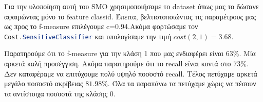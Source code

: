 Για την υλοποίηση αυτή του SMO χρησιμοποιήσαμε το dataset όπως μας το δώσανε αφαιρώντας μόνο το feature classid.
Έπειτα, βελτιστοποιώντας τις παραμέτρους μας ως προς το f-measure επιλέγουμε c=0.94.Ακόμα φορτώσαμε τον \lstinline[language=Java]!Cost.SensitiveClassifier!
και υπολογίσαμε την τιμή $cost(2,1)=3.68$.

Παρατηρούμε ότι το f-measure για την κλάση 1 που μας ενδιαφέρει είναι $63\%$.
Μία αρκετά καλή προσέγγιση.
Ακόμα παρατηρούμε ότι το recall είναι κοντά στο $73\%$.
Δεν καταφέραμε να επιτύχουμε πολύ υψηλό ποσοστό recall.
Τέλος πετύχαμε αρκετά μεγάλο ποσοστό ακρίβειας $81.98\%$.
Όλα τα παραπάνω τα πετύχαμε χώρις να πέσουν τα αντίστοιχα ποσοστά της κλάσης 0.
